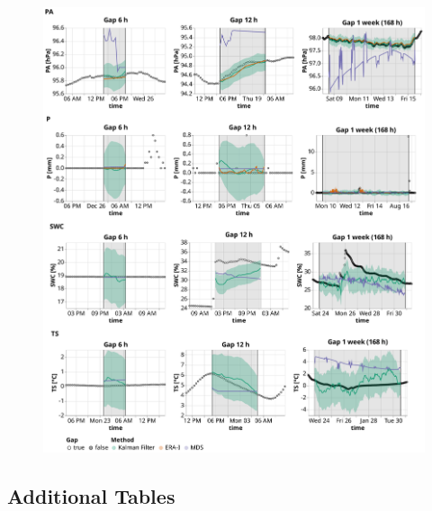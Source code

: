 \documentclass{article}
\newcommand{\imgwidth}{6in}
\let\Oldsubsection\subsection
\renewcommand{\subsection}{\FloatBarrier\Oldsubsection}
\begin{document}
\begin{figure}
\centerline{\includegraphics[width=\imgwidth]{timeseries_2_2}}
\caption{}
\label{fig:ts_3-2}
\end{figure}
\restoregeometry

\subsection{Additional Tables}

\newcommand{\CapStd}{std}


\newcommand{\CapGapLen}{Imputation performance of the Kalman filter in comparison to the state-of-the-art
methods: ERA-Interim (ERA-I) and Marginal Distribution Sampling (MDS), using mean and standard deviation of the \textit{Root Mean Square Error} (RMSE). The best method for each gap length is highlighted in bold.}


\newcommand{\CapSingleVar}{Imputation performance of the Kalman filter in comparison to the state-of-the-art
methods: ERA-Interim (ERA-I) and Marginal Distribution Sampling (MDS), using mean and standard deviation of the \textit{Root Mean Square Error} (RMSE). The best method for each gap length is highlighted in bold.}

\end{document}
